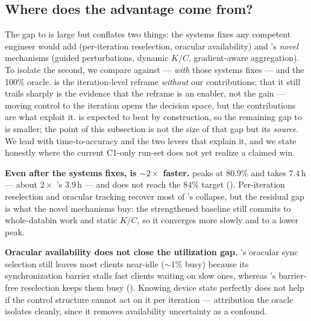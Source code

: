 

\subsection{Where does the advantage come from?}
\label{sec:eval:attribution}

The gap to \fwdllm{} is large but conflates two things: the systems
fixes any competent engineer would add (per-iteration reselection,
oracular availability) and \sys{}'s \emph{novel} mechanisms (guided
perturbations, dynamic $K$/$C$, gradient-aware aggregation). To
isolate the second, we compare against \fwdllmito{} --- \fwdllm{}
\emph{with} those systems fixes --- and the 100\% oracle.
 \fwdllmito{} is the
iteration-level reframe \emph{without} our contributions; that it
still trails \sys{} sharply is the evidence that the reframe is an
enabler, not the gain --- moving control to the iteration opens the
decision space, but the contributions are what exploit it.
\fwdllmito{} is expected to beat \fwdllm{} by construction, so the
remaining gap to \sys{} is smaller; the point of this subsection is
not the size of that gap but its \emph{source}. We lead with
time-to-accuracy and the two levers that explain it, and we state
honestly where the current C1-only run-set does not yet realize a
claimed win.

\textbf{Even after the systems fixes, \sys{} is ${\sim}2\times$
faster.} \fwdllmito{} peaks at $80.9\%$ and takes $7.4$\,h --- about
$2\times$ \sys{}'s $3.9$\,h --- and does not reach the $84\%$ target
(). Per-iteration reselection and oracular
tracking recover most of \fwdllm{}'s collapse, but the residual gap is
what the novel mechanisms buy: the strengthened baseline still commits
to whole-databin work and static $K$/$C$, so it converges more slowly
and to a lower peak.

\textbf{Oracular availability does not close the utilization gap.}
\fwdllmito{}'s oracular sync selection still leaves most clients
near-idle (${\sim}1\%$ busy) because its synchronization barrier
stalls fast clients waiting on slow ones, whereas \sys{}'s
barrier-free reselection keeps them busy ().
Knowing device state perfectly does not help if the control structure
cannot act on it per iteration --- attribution the oracle isolates
cleanly, since it removes availability uncertainty as a confound.

